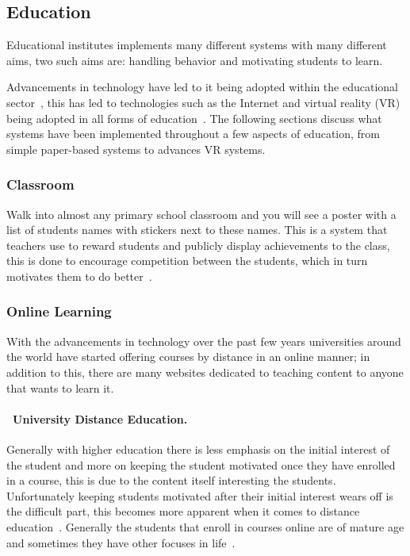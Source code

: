 \documentclass[a4paper,12pt]{article}
\begin{document}
\subsection{Education}\label{sec:education}
Educational institutes implements many different systems with many different aims, two such aims are: handling behavior and motivating students to learn.

\par
Advancements in technology have led to it being adopted within the educational sector~\citep{distance-education}, this has led to technologies such as the Internet and virtual reality (VR) being adopted in all forms of education~\citep{virtual-reality}.
The following sections discuss what systems have been implemented throughout a few aspects of education, from simple paper-based systems to advances VR systems.

\subsubsection{Classroom}\label{sec:classroom}
Walk into almost any primary school classroom and you will see a poster with a list of students names with stickers next to these names. This is a system that teachers use to reward students and publicly display achievements to the class, this is done to encourage competition between the students, which in turn motivates them to do better~\citep{school-kids}.

\subsubsection{Online Learning}
With the advancements in technology over the past few years universities around the world have started offering courses by distance in an online manner; in addition to this, there are many websites dedicated to teaching content to anyone that wants to learn it.

\paragraph{\indent~University Distance Education.}
Generally with higher education there is less emphasis on the initial interest of the student and more on keeping the student motivated once they have enrolled in a course, this is due to the content itself interesting the students. Unfortunately keeping students motivated after their initial interest wears off is the difficult part, this becomes more apparent when it comes to distance education~\citep{distance-education}.
Generally the students that enroll in courses online are of mature age and sometimes they have other focuses in life~\citep{distance-education}.
\end{document}

